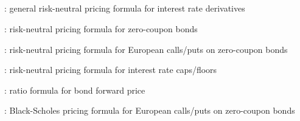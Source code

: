 \subsection*{}
\item {}: general risk-neutral pricing formula for interest rate derivatives
\item {}: risk-neutral pricing formula for zero-coupon bonds
\item {}: risk-neutral pricing formula for European calls/puts on zero-coupon bonds
\item {}: risk-neutral pricing formula for interest rate caps/floors
\item {}: ratio formula for bond forward price
\item {}: Black-Scholes pricing formula for European calls/puts on zero-coupon bonds

